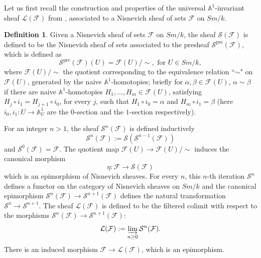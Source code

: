 \documentclass[11pt, reqno]{amsart}
\theoremstyle{plain}
\theoremstyle{definition}
\newtheorem{definition}[thm]{Definition}
\newcommand{\sF}{{\mathcal F}}
\newcommand{\sL}{{\mathcal L}}
\newcommand{\sS}{{\mathcal S}}
\newcommand{\A}{{\mathbb A}}
\begin{document}
Let us first recall the construction and properties of the universal $\A^1$-invariant sheaf $\sL(\sF)$ from \cite{bhs}, associated to a Nisnevich sheaf of sets $\sF$ on $Sm/k$.
\begin{definition} \cite[Definition 2.9]{bhs}
Given a Nisnevich sheaf of sets $\sF$ on $Sm/k$, the sheaf $\sS(\sF)$ is defined to be the Nisnevich sheaf of sets associated to the presheaf $\sS^{\text{pre}}(\sF)$, which is defined as
$$\sS^{\text{pre}}(\sF)(U) = \sF(U)/\sim, \text{ for }U \in Sm/k,$$
where $\sF(U)/\sim$ the quotient corresponding to the equivalence relation ``$\sim$" on $\sF(U)$, generated by the naive $\A^1$-homotopies; briefly for $\alpha, \beta \in \sF(U)$, $\alpha \sim \beta$ if there are naive $\A^1$-homotopies $H_1, \dots, H_m \in \sF(U)$, satisfying $H_j\circ i_1 = H_{j+1}\circ i_0$, for every $j$, such that $H_1 \circ i_0 = \alpha$ and $H_m \circ i_1 = \beta$ (here $i_0, i_1: U \to \A^1_U$ are the $0$-section and the $1$-section respectively).

For an integer $n > 1$, the sheaf $\sS^n(\sF)$ is defined inductively
$$\sS^n(\sF) := \sS(\sS^{n-1}(\sF))$$
and $\sS^0(\sF) = \sF$. The quotient map $\sF(U) \to \sF(U)/\sim$ induces the canonical morphism
$$\eta: \sF \to \sS(\sF)$$
which is an epimorphism of Nisnevich sheaves. For every $n$, this $n$-th iteration $\sS^n$ defines a functor on the category of Nisnevich sheaves on $Sm/k$ and the canonical epimorphism $\sS^n(\sF) \to \sS^{n+1}(\sF)$ defines the natural transformation $\sS^n \to \sS^{n+1}$. The sheaf $\sL(\sF)$ is defined to be the filtered colimit with respect to the morphisms $\sS^n(\sF) \to \sS^{n+1}(\sF)$:
$$\mathcal{L}(\mathcal{F}) := \varinjlim_{n \geq 0}\mathcal{S}^n(\mathcal{F}).$$
There is an induced morphism $\sF \to \sL(\sF)$, which is an epimorphism.
\end{definition}
\end{document}
